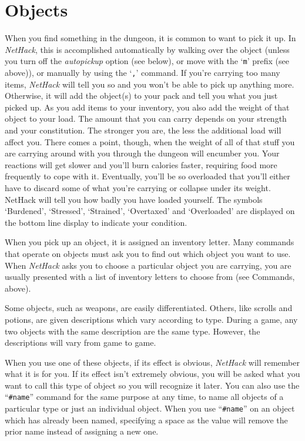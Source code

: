 \section{Objects}

When you find something in the dungeon, it is common to want to pick
it up.  In {\it NetHack}, this is accomplished automatically by walking over
the object (unless you turn off the {\it autopickup\/}
option (see below), or move with the `{\tt m}' prefix (see above)), or
manually by using the `{\tt ,}' command.
If you're carrying too many items, {\it NetHack\/} will tell you so and you
won't be able to pick up anything more.  Otherwise, it will add the object(s)
to your pack and tell you what you just picked up.
As you add items to your inventory, you also add the weight of that object
to your load.  The amount that you can carry depends on your strength and
your constitution.  The
stronger you are, the less the additional load will affect you.  There comes
a point, though, when the weight of all of that stuff you are carrying around
with you through the dungeon will encumber you.  Your reactions
will get slower and you'll burn calories faster, requiring food more frequently
to cope with it.  Eventually, you'll be so overloaded that you'll either have
to discard some of what you're carrying or collapse under its weight.
NetHack will tell you how badly you have loaded yourself.  The symbols
`Burdened', `Stressed', `Strained', `Overtaxed' and `Overloaded' are
displayed on the bottom line display to indicate your condition.

When you pick up an object, it is assigned an inventory letter.  Many
commands that operate on objects must ask you to find out which object
you want to use.  When {\it NetHack\/} asks you to choose a particular object
you are carrying, you are usually presented with a list of inventory
letters to choose from (see Commands, above).

Some objects, such as weapons, are easily differentiated.  Others, like
scrolls and potions, are given descriptions which vary according to
type.  During a game, any two objects with the same description are
the same type.  However, the descriptions will vary from game to game.

When you use one of these objects, if its effect is obvious, {\it NetHack\/}
will remember what it is for you.  If its effect isn't extremely
obvious, you will be asked what you want to call this type of object
so you will recognize it later.  You can also use the ``{\tt \#name}''
command for the same purpose at any time, to name all objects of a
particular type or just an individual object.
When you use ``{\tt \#name}'' on an object which has already been named,
specifying a space as the value will remove the prior name instead
of assigning a new one.

